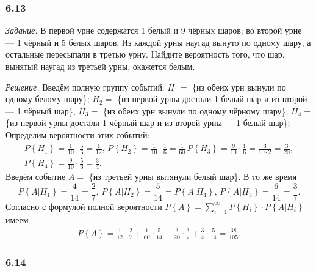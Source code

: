 \subsubsection*{6.13}

\textit{Задание.} В первой урне содержатся 1 белый и 9 чёрных шаров; во второй урне --- 1 чёрный и 5 белых шаров.
Из каждой урны наугад вынуто по одному шару, а остальные пересыпали в третью урну.
Найдите вероятность того, что шар, вынятый наугад из третьей урны, окажется белым.

\textit{Решение.}
Введём полную группу событий:
$H_1 =$ \{из обеих урн вынули по одному белому шару\};
$H_2 =$ \{из первой урны достали 1 белый шар и из второй --- 1 чёрный шар\};
$H_3 =$ \{из обеих урн вынули по одному чёрному шару\};
$H_4 =$ \{из первой урны достали 1 чёрный шар и из второй урны --- 1 белый шар\};
Определим вероятности этих событий:
\begin{equation*}
\begin{split}
P \left\{ H_1 \right\} =
\frac{1}{10} \cdot \frac{5}{6} =
\frac{1}{12}, \,
P \left\{ H_2 \right\} =
\frac{1}{10} \cdot \frac{1}{6} =
\frac{1}{60} \,
P \left\{ H_3 \right\} =
\frac{9}{10} \cdot \frac{1}{6} =
\frac{3}{10 \cdot 2} =
\frac{3}{20}, \\
P \left\{ H_4 \right\} =
\frac{9}{10} \cdot \frac{5}{6} =
\frac{3}{4}.
\end{split}
\end{equation*}
Введём событие $A =$ \{из третьей урны вытянули белый шар\}.
В то же время
$$P \left\{ \left. A \right| H_1 \right\} =
\frac{4}{14} =
\frac{2}{7}, \,
P \left\{ \left. A \right| H_2 \right\} =
\frac{5}{14} =
P \left\{ \left. A \right| H_4 \right\}, \,
P \left\{ \left. A \right| H_3 \right\} =
\frac{6}{14} =
\frac{3}{7}.$$
Согласно с формулой полной вероятности $P \left\{ A \right\} = \sum \limits_{i=1}^\infty P \left\{ H_i \right\} \cdot P \left\{ \left. A \right| H_i \right\} $ имеем
\begin{equation*}
\begin{split}
P \left\{ A \right\} =
\frac{1}{12} \cdot \frac{2}{7} + \frac{1}{60} \cdot \frac{5}{14} + \frac{3}{20} \cdot \frac{3}{7} + \frac{3}{4} \cdot \frac{5}{14} =
\frac{38}{105}.
\end{split}
\end{equation*}

\subsubsection*{6.14}


